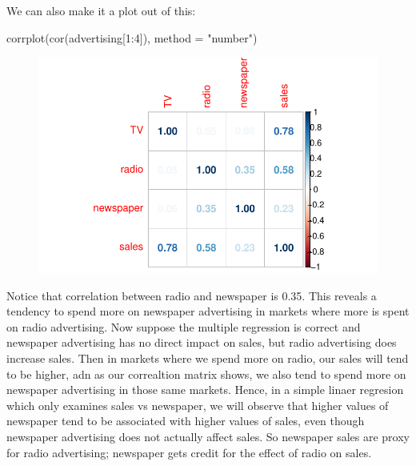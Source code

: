 \documentclass[
  letterpaper,
  DIV=11,
  numbers=noendperiod]{scrreprt}
\newenvironment{Shaded}{\begin{snugshade}}{\end{snugshade}}
\newcommand{\AttributeTok}[1]{\textcolor[rgb]{0.65,0.35,0.00}{#1}}
\newcommand{\DecValTok}[1]{\textcolor[rgb]{0.47,0.16,0.63}{#1}}
\newcommand{\FunctionTok}[1]{\textcolor[rgb]{0.02,0.16,0.49}{#1}}
\newcommand{\NormalTok}[1]{\textcolor[rgb]{0.33,0.33,0.33}{#1}}
\newcommand{\SpecialCharTok}[1]{\textcolor[rgb]{0.00,0.46,0.62}{#1}}
\newcommand{\StringTok}[1]{\textcolor[rgb]{0.00,0.50,0.00}{#1}}
\begin{document}
We can also make it a plot out of this:

\begin{Shaded}
\begin{Highlighting}[]
\FunctionTok{corrplot}\NormalTok{(}\FunctionTok{cor}\NormalTok{(advertising[}\DecValTok{1}\SpecialCharTok{:}\DecValTok{4}\NormalTok{]), }\AttributeTok{method =} \StringTok{"number"}\NormalTok{)}
\end{Highlighting}
\end{Shaded}

\begin{figure}[H]

{\centering \includegraphics{Chapter3_files/figure-pdf/unnamed-chunk-57-1.pdf}

}

\end{figure}

Notice that correlation between radio and newspaper is 0.35. This
reveals a tendency to spend more on newspaper advertising in markets
where more is spent on radio advertising. Now suppose the multiple
regression is correct and newspaper advertising has no direct impact on
sales, but radio advertising does increase sales. Then in markets where
we spend more on radio, our sales will tend to be higher, adn as our
correaltion matrix shows, we also tend to spend more on newspaper
advertising in those same markets. Hence, in a simple linaer regresion
which only examines sales vs newspaper, we will observe that higher
values of newspaper tend to be associated with higher values of sales,
even though newspaper advertising does not actually affect sales. So
newspaper sales are proxy for radio advertising; newspaper gets credit
for the effect of radio on sales.
\end{document}
